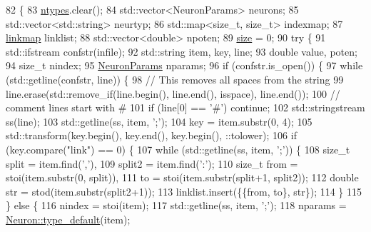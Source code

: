 \begin{DoxyCode}
82                                                            \{
83     \hyperlink{classSimulation_a445d67187d6cc08c4c098ca498ee87d7}{ntypes}.clear();
84     std::vector<NeuronParams> neurons;
85     std::vector<std::string> neurtyp;
86     std::map<size\_t, size\_t> indexmap;
87     \hyperlink{network_8h_a889f48bcec09c9d72a03648e911c5ff5}{linkmap} linklist;
88     std::vector<double> npoten;
89     \hyperlink{classSimulation_ae198f9ac020ed6bc6ebbd608ab3f959d}{size} = 0;
90     \textcolor{keywordflow}{try} \{
91         std::ifstream confstr(infile);
92         std::string item, key, line;
93         \textcolor{keywordtype}{double} value, poten;
94         \textcolor{keywordtype}{size\_t} nindex;
95         \hyperlink{structNeuronParams}{NeuronParams} nparams;
96         \textcolor{keywordflow}{if} (confstr.is\_open()) \{
97             \textcolor{keywordflow}{while} (std::getline(confstr, line)) \{
98                 \textcolor{comment}{// This removes all spaces from the string}
99                 line.erase(std::remove\_if(line.begin(), line.end(), isspace), line.end());
100                 \textcolor{comment}{// comment lines start with #}
101                 \textcolor{keywordflow}{if} (line[0] == \textcolor{charliteral}{'#'}) \textcolor{keywordflow}{continue};
102                 std::stringstream ss(line);
103                 std::getline(ss, item, \textcolor{charliteral}{';'});
104                 key = item.substr(0, 4);
105                 std::transform(key.begin(), key.end(), key.begin(), ::tolower);
106                 \textcolor{keywordflow}{if} (key.compare(\textcolor{stringliteral}{"link"}) == 0) \{
107                     \textcolor{keywordflow}{while} (std::getline(ss, item, \textcolor{charliteral}{';'})) \{
108                         \textcolor{keywordtype}{size\_t} split = item.find(\textcolor{charliteral}{','}),
109                             split2 = item.find(\textcolor{charliteral}{':'});
110                         \textcolor{keywordtype}{size\_t} from = stoi(item.substr(0, split)), 
111                             to = stoi(item.substr(split+1, split2));
112                         \textcolor{keywordtype}{double} str = stod(item.substr(split2+1));
113                         linklist.insert(\{\{from, to\}, str\});
114                     \}
115                 \} \textcolor{keywordflow}{else} \{
116                     nindex = stoi(item);
117                     std::getline(ss, item, \textcolor{charliteral}{';'});
118                     nparams = \hyperlink{classNeuron_a4e5c4e0a512460dd59449a0bec4d0db7}{Neuron::type\_default}(item);

\end{DoxyCode}
